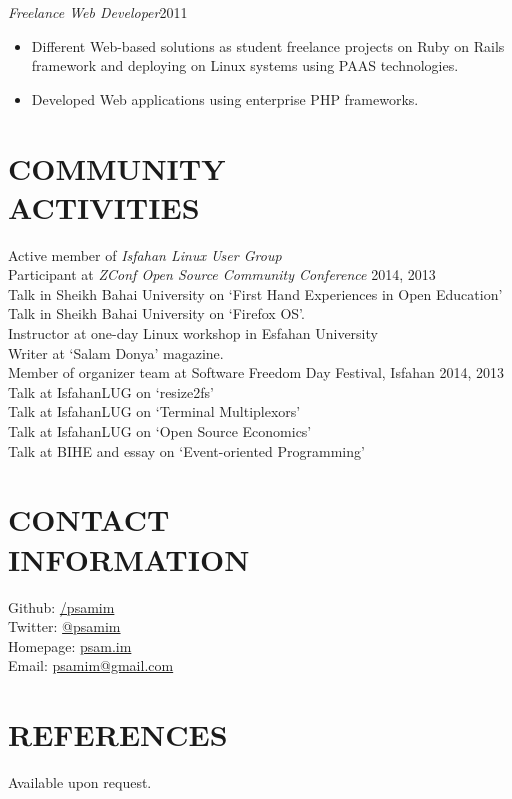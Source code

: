 \documentclass[margin, 10pt]{res} %
\begin{document}
\begin{resume}
{\sl Freelance Web Developer}\hfill 2011 \\
\begin{itemize}
\item Different Web-based solutions as student freelance projects on Ruby on Rails
  framework and deploying on Linux systems using PAAS technologies.
\item Developed Web applications using enterprise PHP frameworks.
\end{itemize} 


\section{COMMUNITY \\ ACTIVITIES}

Active member of {\it Isfahan Linux User Group}\\
Participant at {\it ZConf Open Source Community Conference} 2014, 2013\\
Talk in Sheikh Bahai University on `First Hand Experiences in Open Education'\\
Talk in Sheikh Bahai University on `Firefox OS'.\\
Instructor at one-day Linux workshop in Esfahan University\\
Writer at `Salam Donya' magazine.\\
Member of organizer team at Software Freedom Day Festival, Isfahan 2014, 2013\\
Talk at IsfahanLUG on `resize2fs'\\
Talk at IsfahanLUG on `Terminal Multiplexors'\\
Talk at IsfahanLUG on `Open Source Economics'\\
Talk at BIHE and essay on `Event-oriented Programming'


\section{CONTACT \\ INFORMATION} 
Github: \href{http://github.com/psamim}{/\/psamim} \\
Twitter: \href{http://twitter.com/psamim}{@psamim} \\
Homepage: \href{http://www.psam.im/}{psam.im} \\
Email: \href{mailto:psamim@gmail.com}{psamim@gmail.com}

\section{REFERENCES} 
Available upon request.


\end{resume}
\end{document}

